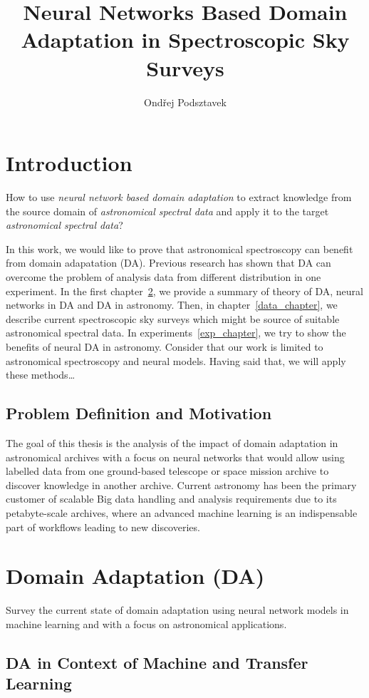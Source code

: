 \documentclass[thesis=M,english]{FITthesis}[2012/10/20]
\title{Neural Networks Based Domain Adaptation in Spectroscopic Sky Surveys}
\author{Ondřej Podsztavek}
\begin{document}
\chapter{Introduction}

How to use \textit{neural network based domain adaptation} to extract knowledge from the source domain of \textit{astronomical spectral data}
and apply it to the target \textit{astronomical spectral data}?

In this work, we would like to prove that astronomical spectroscopy can benefit from domain adapatation (DA).
Previous research has shown that DA can overcome the problem of analysis data from different distribution in one experiment.
In the first chapter~\ref{da_chapter}, we provide a summary of theory of DA, neural networks in DA and DA in astronomy.
Then, in chapter~\ref{data_chapter}, we describe current spectroscopic sky surveys
which might be source of suitable astronomical spectral data.
In experiments~\ref{exp_chapter}, we try to show the benefits of neural DA in astronomy.
Consider that our work is limited to astronomical spectroscopy and neural models.
Having said that, we will apply these methods\dots{}

\section{Problem Definition and Motivation}

The goal of this thesis is the analysis of the impact of domain adaptation in astronomical archives with a focus on neural networks
that would allow using labelled data from one ground-based telescope or space mission archive to discover knowledge in another archive.
Current astronomy has been the primary customer of scalable Big data handling and analysis requirements due to its petabyte-scale archives,
where an advanced machine learning is an indispensable part of workflows leading to new discoveries.

\chapter{Domain Adaptation (DA)}
\label{da_chapter}

Survey the current state of domain adaptation using neural network models in machine learning and with a focus on astronomical applications.

\section{DA in Context of Machine and Transfer Learning}
\end{document}
